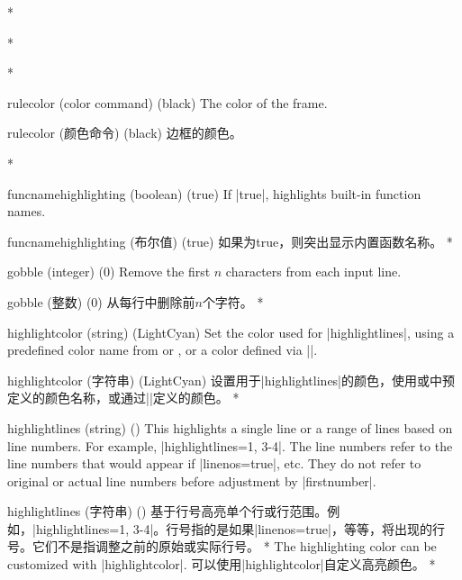 \begin{optionlist}
\begin{paracol}{2}

 



\switchcolumn[0]*%

    
\switchcolumn

\switchcolumn[0]*%
  






\switchcolumn[0]*%
\item[rulecolor (color command) (black)]
The color of the frame.
\switchcolumn
\item[rulecolor (颜色命令) (black)]
边框的颜色。



\switchcolumn[0]*%
  \item[funcnamehighlighting (boolean) (true)] 
    If |true|, highlights built-in function names.
    \switchcolumn
    \item[funcnamehighlighting (布尔值) (true)] 
    如果为true，则突出显示内置函数名称。
\switchcolumn[0]*%
  \item[gobble (integer) (0)]
    Remove the first $n$ characters from each input line.
    \switchcolumn
    \item[gobble (整数) (0)]
    从每行中删除前$n$个字符。
    \switchcolumn[0]*%
\item[highlightcolor (string) (LightCyan)]
Set the color used for |highlightlines|, using a predefined color name from  or , or a color defined via |\definecolor|.
\switchcolumn
\item[highlightcolor (字符串) (LightCyan)]
设置用于|highlightlines|的颜色，使用或中预定义的颜色名称，或通过|\definecolor|定义的颜色。
\switchcolumn[0]*%

\item[highlightlines (string) (\meta{none})]
This highlights a single line or a range of lines based on line numbers.  For example, |highlightlines={1, 3-4}|.  The line numbers refer to the line numbers that would appear if |linenos=true|, etc.  They do not refer to original or actual line numbers before adjustment by |firstnumber|.
\switchcolumn
\item[highlightlines (字符串) (\meta{无})]
基于行号高亮单个行或行范围。例如，|highlightlines={1, 3-4}|。行号指的是如果|linenos=true|，等等，将出现的行号。它们不是指调整之前的原始或实际行号。
\switchcolumn[0]*%
The highlighting color can be customized with |highlightcolor|.
\switchcolumn
可以使用|highlightcolor|自定义高亮颜色。
\switchcolumn[0]*%


\end{paracol}
\end{optionlist}
